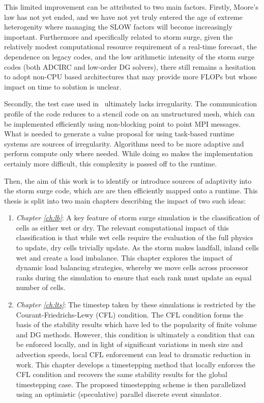 This limited improvement can be attributed to two main factors. Firstly, Moore's law has not yet ended, and we have not yet truly entered the age of extreme heterogenity where managing the SLOW factors will become increasingly important. 
Furthermore and specifically related to storm surge, given the relatively modest computational resource requirement of a real-time forecast, the dependence on legacy codes, and the low arithmetic intensity of the storm surge codes (both ADCIRC and low-order DG solvers), there still remains a hesitation to adopt non-CPU based architectures that may provide more FLOPs but whose impact on time to solution is unclear.

Secondly, the test case used in~\cite{Bremer2019} ultimately lacks irregularity. The communication profile of the code reduces to a stencil code on an unstructured mesh, which can be implemented efficiently using non-blocking point to point MPI messages. What is needed to generate a value proposal for using task-based runtime systems are sources of irregularity. Algorithms need to be more adaptive and perform compute only where needed. While doing so makes the implementation certainly more difficult, this complexity is passed off to the runtime.

Then, the aim of this work is to identify or introduce sources of adaptivity into the storm surge code, which are are then efficiently mapped onto a runtime. This thesis is split into two main chapters describing the impact of two such ideas:
\begin{enumerate}
\item {\em Chapter \ref{ch:lb}}: A key feature of storm surge simulation is the classification of cells as either wet or dry. The relevant computational impact of this classification is that while wet cells require the evaluation of the full physics to update, dry cells trivially update. As the storm makes landfall, inland cells wet and create a load imbalance. This chapter explores the impact of dynamic load balancing strategies, whereby we move cells across processor ranks during the simulation to ensure that each rank must update an equal number of cells.
\item {\em Chapter \ref{ch:lts}}: The timestep taken by these simulations is restricted by the Courant-Friedrichs-Lewy (CFL) condition. The CFL condition forms the basis of the stability results which have led to the popularity of finite volume and DG methods. However, this condition is ultimately a condition that can be enforced locally, and in light of significant variations in mesh size and advection speeds, local CFL enforcement can lead to dramatic reduction in work. This chapter develops a timestepping method that locally enforces the CFL condition and recovers the same stability results for the global timestepping case. The proposed timestepping scheme is then parallelized using an optimistic (speculative) parallel discrete event simulator.
\end{enumerate}